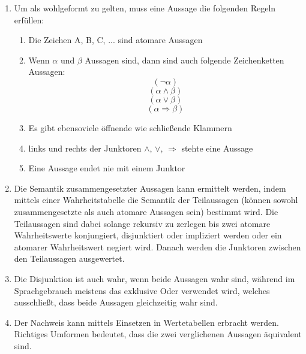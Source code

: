 \documentclass[a4paper]{article}
\begin{document}
\begin{enumerate}
		\item
		Um als wohlgeformt zu gelten, muss eine Aussage die folgenden Regeln erfüllen:
		\begin{enumerate}
			\item Die Zeichen A, B, C, ... sind atomare Aussagen
			
			\item Wenn $\alpha$ und $\beta$ Aussagen sind, dann sind auch folgende Zeichenketten Aussagen:
			\begin{equation*}
				(\lnot \alpha)
			\end{equation*}
			\begin{equation*}
				(\alpha \land \beta)
			\end{equation*}
			\begin{equation*}
				(\alpha \lor \beta)
			\end{equation*}
			\begin{equation*}
				(\alpha \Rightarrow \beta)
			\end{equation*}
			
			\item Es gibt ebensoviele öffnende wie schließende Klammern
			\item links und rechts der Junktoren $\land$, $\lor$, $\Rightarrow$ stehte eine Aussage
			\item Eine Aussage endet nie mit einem Junktor
		\end{enumerate}
		
		\item
		Die Semantik zusammengesetzter Aussagen kann ermittelt werden, indem mittels einer Wahrheitstabelle die Semantik der Teilaussagen (können sowohl zusammengesetzte als auch atomare Aussagen sein) bestimmt wird. Die Teilaussagen sind dabei solange rekursiv zu zerlegen bis zwei atomare Wahrheitswerte konjungiert, disjunktiert oder impliziert werden oder ein atomarer Wahrheitswert negiert wird. Danach werden die Junktoren zwischen den Teilaussagen ausgewertet.
		
		\item
		Die Disjunktion ist auch wahr, wenn beide Aussagen wahr sind, während im Sprachgebrauch meistens das exklusive Oder verwendet wird, welches ausschließt, dass beide Aussagen gleichzeitig wahr sind.
		
		\item
		Der Nachweis kann mittels Einsetzen in Wertetabellen erbracht werden. Richtiges Umformen bedeutet, dass die zwei verglichenen Aussagen äquivalent sind.
		

\end{enumerate}
\end{document}
